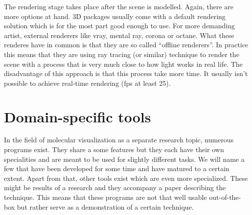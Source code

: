 \documentclass[
  digital, %
  table,   %
  nolof,     %
  nolot,     %
]{fithesis3}
\begin{document}

The rendering stage takes place after the scene is modelled. Again, there are more options at hand. 3D packages usually come with a default rendering solution which is for the most part good enough to use. For more demanding artist, external renderers like vray, mental ray, corona or octane. What these renderes have in common is that they are so called ``offline renderers''. In practice this means that they are using ray tracing (or similar) technique to render the scene with a process that is very much close to how light works in real life. The disadvantage of this approach is that this process take more time. It usually isn't possible to achieve real-time rendering (fps at least 25).


\section{Domain-specific tools}
In the field of molecular visualization as a separate research topic, numerous programs exist. They share a some features but they each have their own specialities and are meant to be used for slightly different tasks. We will name a few that have been developed for some time and have matured to a certain extent. Apart from that, other tools exist which are even more specialized. These might be results of a research and they accompany a paper describing the technique. This means that these programs are not that well usable out-of-the-box but rather serve as a demonstration of a certain technique.
\end{document}
